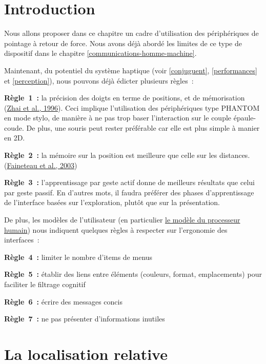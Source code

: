 \documentclass[
]{book}
\begin{document}
\hypertarget{introduction-4}{%
\section{Introduction}\label{introduction-4}}

Nous allons proposer dans ce chapitre un cadre d'utilisation des
périphériques de pointage à retour de force. Nous avons déjà abordé les
limites de ce type de dispositif dans le chapitre
\ref{communications-homme-machine}.

Maintenant, du potentiel du système haptique (voir \ref{conjuguent},
\ref{performances} et \ref{perception}), nous pouvons déjà édicter
plusieurs règles~:

\textbf{Règle~1~:}
la précision des doigts en terme de positions,
et de mémorisation (\protect\hyperlink{ref-zhai1996influence}{Zhai et al., 1996}). Ceci implique l'utilisation des périphériques type PHANTOM en
mode stylo, de manière à ne pas trop baser l'interaction sur le couple
épaule-coude. De plus, une souris peut rester préférable car elle est plus
simple à manier en 2D.

\textbf{Règle~2~:}
la mémoire sur la position est meilleure que
celle sur les distances. (\protect\hyperlink{ref-faineteau2003kinaesthetic}{Faineteau et al., 2003})

\textbf{Règle~3~:}
l'apprentissage par geste actif donne de
meilleurs résultats que celui par geste passif. En d'autres mots, il faudra
préférer des phases d'apprentissage de l'interface basées sur
l'exploration, plutôt que sur la présentation.

De plus, les modèles de l'utilisateur (en particulier \protect\hyperlink{processeur}{le modèle du
processeur humain}) nous indiquent quelques règles à
respecter sur l'ergonomie des interfaces~:

\textbf{Règle~4~:}
limiter le nombre d'items de menus

\textbf{Règle~5~:}
établir des liens entre éléments (couleurs,
format, emplacements) pour faciliter le filtrage cognitif

\textbf{Règle~6~:}
écrire des messages concis

\textbf{Règle~7~:}
ne pas présenter d'informations inutiles

\hypertarget{la-localisation-relative-1}{%
\section{La localisation relative}\label{la-localisation-relative-1}}
\end{document}
